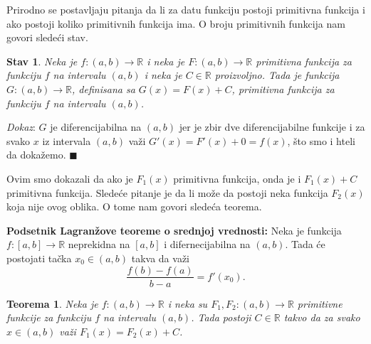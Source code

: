 \documentclass{article}
\newtheorem{teorema}{Teorema}[section]
\newtheorem{stav}{Stav}[section]
\begin{document}
Prirodno se postavljaju pitanja da li za datu funkciju postoji primitivna funkcija
i ako postoji koliko primitivnih funkcija ima. O broju primitivnih funkcija nam
govori sledeći stav.

\begin{stavbox}
    \label{stav_1.1}
    \begin{stav}
        Neka je $f: \left(a, b\right) \longrightarrow \mathbb{R}$ i neka je
        $F:\left(a,b\right)\longrightarrow\mathbb{R}$ primitivna funkcija za funkciju
        $f$ na intervalu $\left(a, b\right)$ i neka je $C \in \mathbb{R}$ proizvoljno.
        Tada je funkcija $G: \left(a, b\right) \longrightarrow \mathbb{R}$, definisana
        sa $G\left(x\right) = F\left(x\right) + C$, primitivna funkcija za funkciju
        $f$ na intervalu $\left(a, b\right)$.
    \end{stav}
\end{stavbox}

\textit{Dokaz}: $G$ je diferencijabilna na $\left(a, b\right)$ jer je zbir dve diferencijabilne
funkcije i za svako $x$ iz intervala $\left(a, b\right)$ važi
$G'\left(x\right)=F'\left(x\right)+0=f\left(x\right)$, što smo i hteli da dokažemo.
\null\hfill $\blacksquare$\par

Ovim smo dokazali da ako je $F_1\left(x\right)$ primitivna funkcija, onda je i $F_1\left(x\right)+C$
primitivna funkcija. Sledeće pitanje je da li može da postoji neka funkcija $F_2\left(x\right)$
koja nije ovog oblika. O tome nam govori sledeća teorema.

\begin{teoremabox}
    \label{podsetnik_teoreme_2}
    \textbf{Podsetnik Lagranžove teoreme o srednjoj vrednosti:} Neka je funkcija
    $f : \left[a,b\right]\longrightarrow\mathbb{R}$ neprekidna na $\left[a,b\right]$
    i difernecijabilna na $\left(a,b\right)$. Tada će
    postojati tačka $x_0\in\left(a,b\right)$ takva da važi
    $$\displaystyle\frac{f\left(b\right)-f\left(a\right)}{b-a}=f'\left(x_0\right).$$
\end{teoremabox}

\begin{teoremabox}
    \label{teorema_1.1}
    \begin{teorema}
        Neka je $f: \left(a, b\right) \longrightarrow \mathbb{R}$ i neka su
        $F_1,F_2:\left(a,b\right)\longrightarrow\mathbb{R}$ primitivne funkcije
        za funkciju $f$ na intervalu $\left(a, b\right)$. Tada postoji $C\in\mathbb{R}$
        takvo da za svako $x\in\left(a,b\right)$ važi $F_1\left(x\right)=F_2\left(x\right)+C$.
    \end{teorema}
\end{teoremabox}
\end{document}
